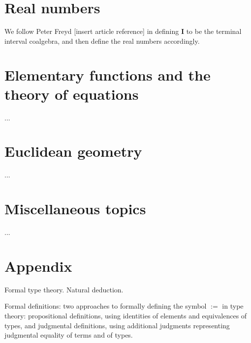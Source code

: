 \documentclass[one]{article}
\begin{document}
\section{Real numbers}

We follow Peter Freyd [insert article reference] in defining $\mathbf{I}$ to be the terminal interval coalgebra, and then define the real numbers accordingly. 

\section{Elementary functions and the theory of equations}

...

\section{Euclidean geometry}

...

\section{Miscellaneous topics}

...

\section{Appendix}

Formal type theory. Natural deduction. 

Formal definitions: two approaches to formally defining the symbol $:=$ in type theory: propositional definitions, using identities of elements and equivalences of types, and judgmental definitions, using additional judgments representing judgmental equality of terms and of types. 
\end{document}
